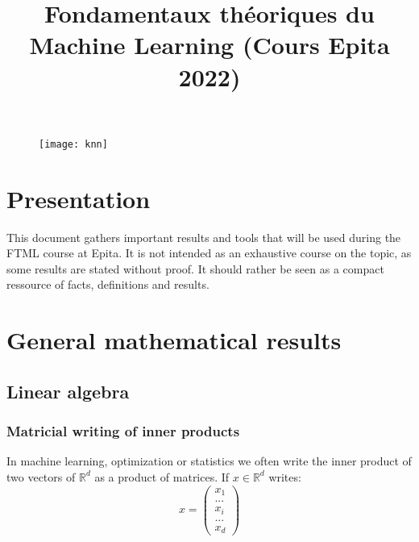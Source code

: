 \documentclass[
10pt, %
a4paper, %
oneside, %
headinclude,footinclude, %
BCOR5mm, %
]{scrartcl}
\title{{Fondamentaux théoriques du Machine Learning (Cours Epita 2022)}}
\author{\spacedlowsmallcaps{Nicolas Le Hir}}
\date{}
\begin{document}
\renewcommand{\sectionmark}[1]{\markright{\spacedlowsmallcaps{#1}}}
\lehead{\mbox{\llap{\small\thepage\kern1em\color{halfgray} \vline}\color{halfgray}\hspace{0.5em}\rightmark\hfil}} 
\pagestyle{scrheadings}
\maketitle 
\setcounter{tocdepth}{3} 

\begin{figure}[htpb]
    \centering
    \texttt{[image: knn]}
    \label{fig:knn}
\end{figure}

\tableofcontents

\section*{\large\color{Blue}Presentation}

This document gathers important results and tools that will be used during the FTML course at Epita. It is not intended as an exhaustive course on the topic, as some results are stated without proof. It should rather be seen as a compact ressource of facts, definitions and results.

\section{\large\color{Blue}General mathematical results}

\subsection{\large\color{MidnightBlue}Linear algebra}

\subsubsection{\large\color{Periwinkle}Matricial writing of inner products}
\label{ssec:linalg}

In machine learning, optimization or statistics we often write the inner product of two vectors of $ \mathbb{R}^d$ as a product of matrices. If $x\in \mathbb{R}^d$ writes:
\begin{equation*}
x=\begin{pmatrix}
x_{1}\\
...\\
x_{i}\\
...\\
x_{d}
\end{pmatrix}
\end{equation*}
\end{document}

